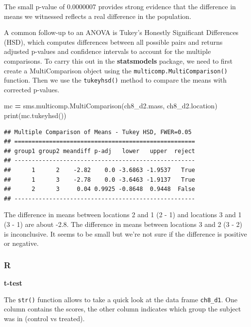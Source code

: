 \documentclass[
]{book}
\newenvironment{Shaded}{\begin{snugshade}}{\end{snugshade}}
\newcommand{\BuiltInTok}[1]{#1}
\newcommand{\NormalTok}[1]{#1}
\newcommand{\OperatorTok}[1]{\textcolor[rgb]{0.81,0.36,0.00}{\textbf{#1}}}
\begin{document}
The small p-value of 0.0000007 provides strong evidence that the difference in means we witnessed reflects a real difference in the population.

A common follow-up to an ANOVA is Tukey's Honestly Significant Differences (HSD), which computes differences between all possible pairs and returns adjusted p-values and confidence intervals to account for the multiple comparisons. To carry this out in the \textbf{statsmodels} package, we need to first create a MultiComparison object using the \texttt{multicomp.MultiComparison()} function. Then we use the \texttt{tukeyhsd()} method to compare the means with corrected p-values.

\begin{Shaded}
\begin{Highlighting}[]
\NormalTok{mc }\OperatorTok{=}\NormalTok{ sms.multicomp.MultiComparison(ch8\_d2.mass, ch8\_d2.location)}
\BuiltInTok{print}\NormalTok{(mc.tukeyhsd())}
\end{Highlighting}
\end{Shaded}

\begin{verbatim}
## Multiple Comparison of Means - Tukey HSD, FWER=0.05 
## ====================================================
## group1 group2 meandiff p-adj   lower   upper  reject
## ----------------------------------------------------
##      1      2    -2.82    0.0 -3.6863 -1.9537   True
##      1      3    -2.78    0.0 -3.6463 -1.9137   True
##      2      3     0.04 0.9925 -0.8648  0.9448  False
## ----------------------------------------------------
\end{verbatim}

The difference in means between locations 2 and 1 (2 - 1) and locations 3 and 1 (3 - 1) are about -2.8. The difference in means between locations 3 and 2 (3 - 2) is inconclusive. It seems to be small but we're not sure if the difference is positive or negative.

\hypertarget{r-47}{%
\subsubsection*{R}\label{r-47}}

\textbf{t-test}

The \texttt{str()} function allows to take a quick look at the data frame \texttt{ch8\_d1}. One column contains the scores, the other column indicates which group the subject was in (control vs treated).
\end{document}

